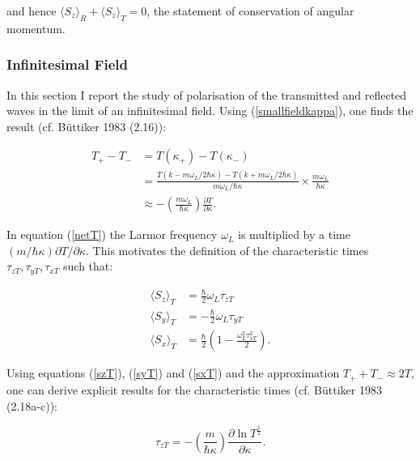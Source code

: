 \documentclass{article}
\begin{document}
\noindent and hence $\langle S_z \rangle_R + \langle S_z \rangle_T = 0$, the statement of conservation of angular momentum. 

\subsubsection{Infinitesimal Field}
In this section I report the study of polarisation of the transmitted and reflected waves in the limit of an infinitesimal field. Using (\ref{smallfieldkappa}), one finds the result (cf. B{\"u}ttiker 1983 (2.16)):

\begin{subequations}
\begin{align}
	T_+-T_- &= T(\kappa_+)-T(\kappa_-)\\
		&= \frac{T(k-m\omega_L/2\hbar\kappa)-T(k+m\omega_L/2\hbar\kappa)}{m\omega_L/\hbar\kappa}\times \frac{m\omega_L}{\hbar\kappa} \\
		&\approx-\left(\frac{m\omega_L}{\hbar\kappa}\right)\frac{\partial T}{\partial \kappa}. \label{netT}
\end{align}
\end{subequations}

\noindent In equation (\ref{netT}) the Larmor frequency $\omega_L$ is multiplied by a time $(m/\hbar\kappa) \partial T/\partial \kappa$. This motivates the definition of the characteristic times $\tau_{zT}, \tau_{yT}, \tau_{xT}$ such that:

\begin{subequations}  
\label{characteristictransmissiontimes}
\begin{align}	
	\langle S_z \rangle_T &= \frac{\hbar}{2}\omega_L\tau_{zT} \\
	\langle S_y \rangle_T &= -\frac{\hbar}{2}\omega_L\tau_{yT} \\
	\langle S_x \rangle_T &= \frac{\hbar}{2}\left(1-\frac{\omega_L^2\tau_{xT}^2}{2}\right).
\end{align}
\end{subequations}

\noindent Using equations (\ref{szT}), (\ref{syT}) and (\ref{sxT}) and the approximation $T_++T_- \approx 2T$, one can derive explicit results for the characteristic times (cf. B{\"u}ttiker 1983 (2.18a-c)):

\begin{equation}
	\tau_{zT} = -\left(\frac{m}{\hbar\kappa}\right)\frac{\partial \ln{T^{\frac{1}{2}}}}{\partial\kappa}. \label{tauz}
\end{equation}
\end{document}
